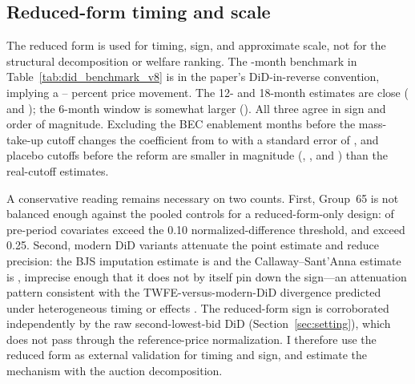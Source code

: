 \subsection{Reduced-form timing and scale}

The reduced form is used for timing, sign, and approximate scale, not for the
structural decomposition or welfare ranking. The \structuralWindowM-month
benchmark in Table~\ref{tab:did_benchmark_v8} is \didPriceEighteenPbu{} in
the paper's DiD-in-reverse convention, implying a \didLowerPct--\didUpperPct{}
percent price movement. The 12- and 18-month estimates are close
(\didPriceTwelvePbu{} and \didPriceEighteenPbu{}); the 6-month window is
somewhat larger (\didPriceSixPbu{}). All three agree in sign and order of
magnitude. Excluding the BEC enablement months before the mass-take-up
cutoff changes the coefficient from \phasedDidFull{} to \phasedDidTrunc{}
with a standard error of \phasedDidSe, and placebo cutoffs before the reform
are smaller in magnitude (\placeboSeventeenSep, \placeboSeventeenMar, and
\placeboSeventeenJun) than the real-cutoff estimates.

A conservative reading remains necessary on two counts. First, Group~65 is
not balanced enough against the pooled controls for a reduced-form-only
design: \balanceNVarsAboveTen{} of \balanceNVarsTotal{} pre-period
covariates exceed the 0.10 normalized-difference threshold, and
\balanceNVarsAboveTwentyFive{} exceed 0.25. Second, modern DiD variants
attenuate the point estimate and reduce precision: the BJS imputation
estimate \citep{borusyak2024} is \didAltBjsEst{} and the Callaway--Sant'Anna
estimate \citep{callaway2021} is \didAltCsEst{}, imprecise enough that it
does not by itself pin down the sign---an attenuation pattern consistent
with the TWFE-versus-modern-DiD divergence predicted under heterogeneous
timing or effects \citep{dechaisemartin2020,goodmanbacon2021,sun2021}. The
reduced-form sign is corroborated independently by the raw second-lowest-bid
DiD (Section~\ref{sec:setting}), which does not pass through the
reference-price normalization. I therefore use the reduced form as external
validation for timing and sign, and estimate the mechanism with the auction
decomposition.

